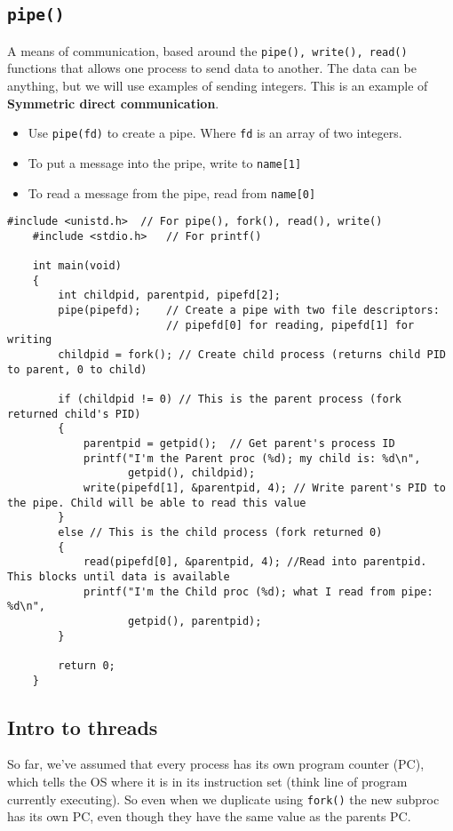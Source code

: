 \documentclass[a4paper, 10pt]{article}
\begin{document}
\subsection{\texttt{pipe()}}
A means of communication, based around the \texttt{pipe(), write(), read()} functions that allows one process to send data to another. The data can be anything, but we will use examples of sending integers. This is an example of \textbf{Symmetric direct communication}.
\begin{itemize}
    \item Use \texttt{pipe(fd)} to create a pipe. Where \texttt{fd} is an array of two integers.
    \item To put a message into the pripe, write to \texttt{name[1]}
    \item To read a message from the pipe, read from \texttt{name[0]}
\end{itemize}
\begin{lstlisting}[style=cStyle, caption={Pipe example}]
    #include <unistd.h>  // For pipe(), fork(), read(), write()
    #include <stdio.h>   // For printf()

    int main(void)
    {
        int childpid, parentpid, pipefd[2];
        pipe(pipefd);    // Create a pipe with two file descriptors:
                         // pipefd[0] for reading, pipefd[1] for writing
        childpid = fork(); // Create child process (returns child PID to parent, 0 to child)
        
        if (childpid != 0) // This is the parent process (fork returned child's PID)
        {
            parentpid = getpid();  // Get parent's process ID
            printf("I'm the Parent proc (%d); my child is: %d\n",
                   getpid(), childpid);
            write(pipefd[1], &parentpid, 4); // Write parent's PID to the pipe. Child will be able to read this value
        }
        else // This is the child process (fork returned 0)
        {
            read(pipefd[0], &parentpid, 4); //Read into parentpid. This blocks until data is available
            printf("I'm the Child proc (%d); what I read from pipe: %d\n",
                   getpid(), parentpid);
        }
        
        return 0;
    }
\end{lstlisting}
\subsection{Intro to threads}
So far, we've assumed that every process has its own program counter (PC), which tells the OS where it is in its instruction set (think line of program currently executing). So even when we duplicate using \texttt{fork()} the new subproc has its own PC, even though they have the same value as the parents PC. \\[2ex]
\end{document}
